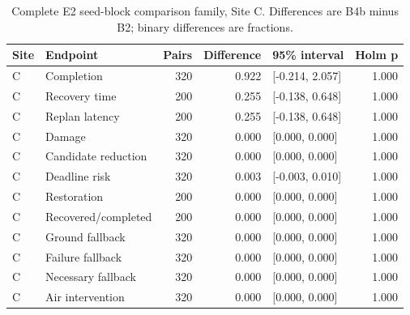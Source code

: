 \begin{table}[H]\centering\footnotesize
\caption{Complete E2 seed-block comparison family, Site C. Differences are B4b minus B2; binary differences are fractions.}\label{tab:e2_C}
\begin{tabularx}{\textwidth}{@{}lYrrYr@{}}\toprule
Site & Endpoint & Pairs & Difference & 95\% interval & Holm p \\\midrule
C & Completion & 320 & 0.922 & [-0.214, 2.057] & 1.000 \\
C & Recovery time & 200 & 0.255 & [-0.138, 0.648] & 1.000 \\
C & Replan latency & 200 & 0.255 & [-0.138, 0.648] & 1.000 \\
C & Damage & 320 & 0.000 & [0.000, 0.000] & 1.000 \\
C & Candidate reduction & 320 & 0.000 & [0.000, 0.000] & 1.000 \\
C & Deadline risk & 320 & 0.003 & [-0.003, 0.010] & 1.000 \\
C & Restoration & 200 & 0.000 & [0.000, 0.000] & 1.000 \\
C & Recovered/completed & 200 & 0.000 & [0.000, 0.000] & 1.000 \\
C & Ground fallback & 320 & 0.000 & [0.000, 0.000] & 1.000 \\
C & Failure fallback & 320 & 0.000 & [0.000, 0.000] & 1.000 \\
C & Necessary fallback & 320 & 0.000 & [0.000, 0.000] & 1.000 \\
C & Air intervention & 320 & 0.000 & [0.000, 0.000] & 1.000 \\
\bottomrule\end{tabularx}\end{table}
